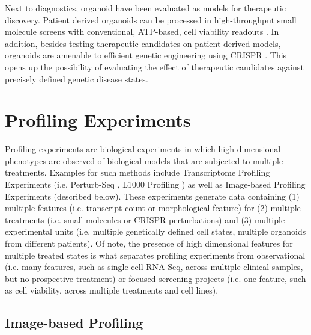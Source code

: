 \begin{flushleft}
Next to diagnostics, organoid have been evaluated as models for therapeutic discovery. Patient derived organoids can be processed in high-throughput small molecule screens with conventional, ATP-based, cell viability readouts \parencite{vandeweteringProspectiveDerivationLiving2015}. In addition, besides testing therapeutic candidates on patient derived models, organoids are amenable to efficient genetic engineering using CRISPR \parencite{matanoModelingColorectalCancer2015a, drostSequentialCancerMutations2015}. This opens up the possibility of evaluating the effect of therapeutic candidates against precisely defined genetic disease states.

\section{Profiling Experiments} 

Profiling experiments are biological experiments in which high dimensional phenotypes are observed of biological models that are subjected to multiple treatments. Examples for such methods include Transcriptome Profiling Experiments (i.e. Perturb-Seq \parencite{dixitPerturbSeqDissectingMolecular2016}, L1000 Profiling \parencite{subramanianNextGenerationConnectivity2017}) as well as Image-based Profiling Experiments \parencite{caicedoApplicationsImagebasedProfiling2016} (described below). These experiments generate data containing (1) multiple features (i.e. transcript count or morphological feature) for (2) multiple treatments (i.e. small molecules or CRISPR perturbations) and (3) multiple experimental units (i.e. multiple genetically defined cell states, multiple organoids from different patients). Of note, the presence of high dimensional features for multiple treated states is what separates profiling experiments from observational (i.e. many features, such as single-cell RNA-Seq, across multiple clinical samples, but no prospective treatment) or focused screening projects (i.e. one feature, such as cell viability, across multiple treatments and cell lines). 

\subsection{Image-based Profiling}


\end{flushleft}

